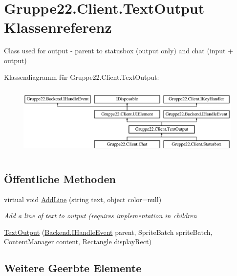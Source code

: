 \hypertarget{class_gruppe22_1_1_client_1_1_text_output}{\section{Gruppe22.\-Client.\-Text\-Output Klassenreferenz}
\label{class_gruppe22_1_1_client_1_1_text_output}
}


Class used for output -\/ parent to statusbox (output only) and chat (input + output)  


Klassendiagramm für Gruppe22.\-Client.\-Text\-Output\-:\begin{figure}[H]
\begin{center}
\leavevmode
\includegraphics[height=3.589744cm]{class_gruppe22_1_1_client_1_1_text_output}
\end{center}
\end{figure}
\subsection*{Öffentliche Methoden}
\begin{DoxyCompactItemize}
\item 
virtual void \hyperlink{class_gruppe22_1_1_client_1_1_text_output_a1350976d5c45cef2d5227b5c4e097896}{Add\-Line} (string text, object color=null)
\begin{DoxyCompactList}\small\item\em Add a line of text to output (requires implementation in children \end{DoxyCompactList}\item 
\hyperlink{class_gruppe22_1_1_client_1_1_text_output_a7e08485e517fccfb2dbc1ed5507f40f2}{Text\-Output} (\hyperlink{interface_gruppe22_1_1_backend_1_1_i_handle_event}{Backend.\-I\-Handle\-Event} parent, Sprite\-Batch sprite\-Batch, Content\-Manager content, Rectangle display\-Rect)
\end{DoxyCompactItemize}
\subsection*{Weitere Geerbte Elemente}


